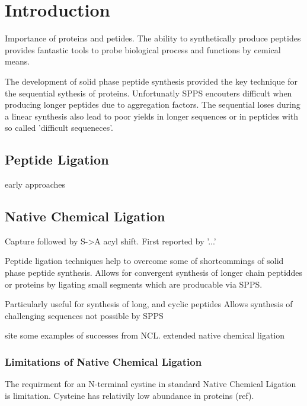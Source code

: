 \chapter{Introduction}
\ifpdf
    \graphicspath{{Introduction/IntroductionFigs/PNG/}{Introduction/IntroductionFigs/PDF/}{Introduction/IntroductionFigs/}}
\else
    \graphicspath{{Introduction/IntroductionFigs/EPS/}{Introduction/IntroductionFigs/}}
\fi

Importance of proteins and petides. The ability to synthetically produce peptides provides fantastic tools to probe biological process and functions by cemical means.

The development of solid phase peptide synthesis provided the key technique for the sequential sythesis of proteins. Unfortunatly SPPS encouters difficult  when producing longer peptides due to aggregation factors. The sequential loses during a linear synthesis also lead to poor yields in longer sequences or in peptides with so called 'difficult sequeneces'.

\section{Peptide Ligation}

early approaches

\section{Native Chemical Ligation}

Capture followed by S->A acyl shift. First reported by '...'

Peptide ligation techniques help to overcome some of shortcommings of solid phase peptide synthesis. Allows for convergent synthesis of longer chain peptiddes or proteins by ligating small segments which are producable via SPPS.

Particularly useful for synthesis of long, and cyclic peptides
Allows synthesis of challenging sequences not possible by SPPS

site some examples of successes from NCL.
extended native chemical ligation

\subsection{Limitations of Native Chemical Ligation}

The requirment for an N-terminal cystine in standard Native Chemical Ligation is limitation. Cysteine has relativily low abundance in proteins (ref).

